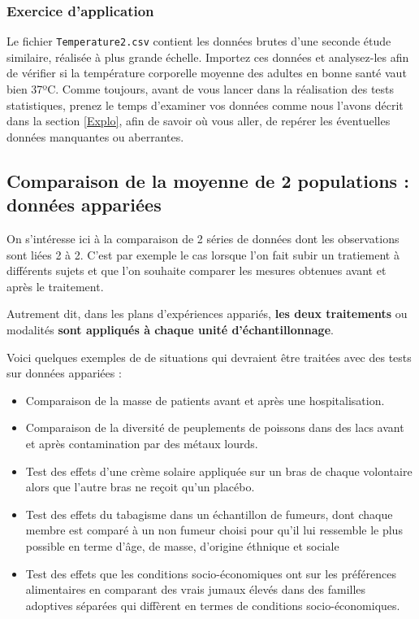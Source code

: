 \documentclass[a4paperpaper,]{article}
\providecommand{\tightlist}{%
  \setlength{\itemsep}{0pt}\setlength{\parskip}{0pt}}
\begin{document}
\hypertarget{exercice-dapplication}{%
\subsubsection{Exercice d'application}\label{exercice-dapplication}}

Le fichier \texttt{Temperature2.csv} contient les données brutes d'une seconde étude similaire, réalisée à plus grande échelle. Importez ces données et analysez-les afin de vérifier si la température corporelle moyenne des adultes en bonne santé vaut bien 37ºC. Comme toujours, avant de vous lancer dans la réalisation des tests statistiques, prenez le temps d'examiner vos données comme nous l'avons décrit dans la section \ref{Explo}, afin de savoir où vous aller, de repérer les éventuelles données manquantes ou aberrantes.

\hypertarget{comparaison-de-la-moyenne-de-2-populations-donnees-appariees}{%
\subsection{Comparaison de la moyenne de 2 populations : données appariées}\label{comparaison-de-la-moyenne-de-2-populations-donnees-appariees}}

On s'intéresse ici à la comparaison de 2 séries de données dont les observations sont liées 2 à 2. C'est par exemple le cas lorsque l'on fait subir un tratiement à différents sujets et que l'on souhaite comparer les mesures obtenues avant et après le traitement.

Autrement dit, dans les plans d'expériences appariés, \textbf{les deux traitements} ou modalités \textbf{sont appliqués à chaque unité d'échantillonnage}.

Voici quelques exemples de de situations qui devraient être traitées avec des tests sur données appariées :

\begin{itemize}
\tightlist
\item
  Comparaison de la masse de patients avant et après une hospitalisation.
\item
  Comparaison de la diversité de peuplements de poissons dans des lacs avant et après contamination par des métaux lourds.
\item
  Test des effets d'une crème solaire appliquée sur un bras de chaque volontaire alors que l'autre bras ne reçoit qu'un placébo.
\item
  Test des effets du tabagisme dans un échantillon de fumeurs, dont chaque membre est comparé à un non fumeur choisi pour qu'il lui ressemble le plus possible en terme d'âge, de masse, d'origine éthnique et sociale
\item
  Test des effets que les conditions socio-économiques ont sur les préférences alimentaires en comparant des vrais jumaux élevés dans des familles adoptives séparées qui diffèrent en termes de conditions socio-économiques.
\end{itemize}
\end{document}
